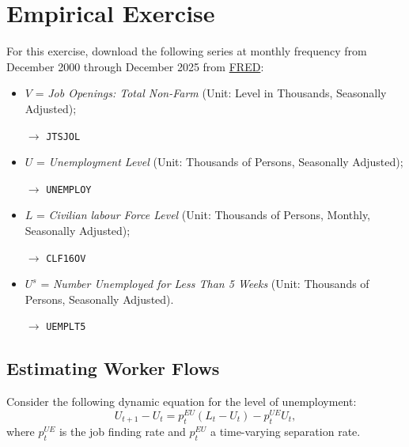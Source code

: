 \documentclass[dvipsnames,11pt]{article}
\begin{document}
\newpage
\section{Empirical Exercise}

    For this exercise, download the following series at monthly frequency from December 2000 through December 2025 from \href{fred.stlouisfed.org}{FRED}:
    \begin{itemize}
        \item $V$ = \textit{Job Openings: Total Non-Farm} (Unit: Level in Thousands, Seasonally Adjusted);

            \(\to\) \texttt{JTSJOL}
        
        \item $U$ = \textit{Unemployment Level} (Unit: Thousands of Persons, Seasonally Adjusted);

            \(\to\) \texttt{UNEMPLOY} 
            
        \item $L$ = \textit{Civilian labour Force Level}  (Unit: Thousands of Persons, Monthly, Seasonally Adjusted);

            \(\to\) \texttt{CLF16OV}
        
        \item $U^s$ = \textit{Number Unemployed for Less Than 5 Weeks} (Unit: Thousands of Persons, Seasonally Adjusted).

            \(\to\) \texttt{UEMPLT5}
            
    \end{itemize}
    
    \subsection{Estimating Worker Flows}

        Consider the following dynamic equation for the level of unemployment:
        \begin{equation*}
            U_{t+1} -  U_{t} = p_t^{EU} (L_t-U_{t}) - p_t^{UE} U_t,
        \end{equation*}
        where $p_t^{UE}$ is the job finding rate and $p_t^{EU}$ a time-varying separation rate.
\end{document}
